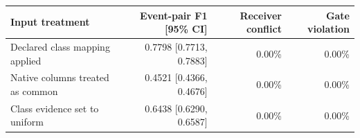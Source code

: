 \begin{tabular*}{\linewidth}{@{\extracolsep{\fill}}lrrr@{}}\toprule
Input treatment & Event-pair F1 [95\% CI] & Receiver conflict & Gate violation \\\midrule
Declared class mapping applied & 0.7798 [0.7713, 0.7883] & 0.00\% & 0.00\% \\
Native columns treated as common & 0.4521 [0.4366, 0.4676] & 0.00\% & 0.00\% \\
Class evidence set to uniform & 0.6438 [0.6290, 0.6587] & 0.00\% & 0.00\% \\
\bottomrule\end{tabular*}
